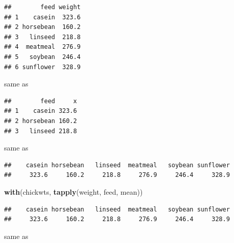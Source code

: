 \documentclass[]{book}
\newenvironment{Shaded}{\begin{snugshade}}{\end{snugshade}}
\newcommand{\DataTypeTok}[1]{\textcolor[rgb]{0.13,0.29,0.53}{#1}}
\newcommand{\DecValTok}[1]{\textcolor[rgb]{0.00,0.00,0.81}{#1}}
\newcommand{\KeywordTok}[1]{\textcolor[rgb]{0.13,0.29,0.53}{\textbf{#1}}}
\newcommand{\NormalTok}[1]{#1}
\newcommand{\OperatorTok}[1]{\textcolor[rgb]{0.81,0.36,0.00}{\textbf{#1}}}
\begin{document}
\begin{verbatim}
##        feed weight
## 1    casein  323.6
## 2 horsebean  160.2
## 3   linseed  218.8
## 4  meatmeal  276.9
## 5   soybean  246.4
## 6 sunflower  328.9
\end{verbatim}

same as

\begin{Shaded}
\end{Shaded}

\begin{verbatim}
##        feed     x
## 1    casein 323.6
## 2 horsebean 160.2
## 3   linseed 218.8
\end{verbatim}

same as

\begin{Shaded}
\end{Shaded}

\begin{verbatim}
##    casein horsebean   linseed  meatmeal   soybean sunflower 
##     323.6     160.2     218.8     276.9     246.4     328.9
\end{verbatim}

\begin{Shaded}
\begin{Highlighting}[]
\KeywordTok{with}\NormalTok{(chickwts, }\KeywordTok{tapply}\NormalTok{(weight, feed, mean))}
\end{Highlighting}
\end{Shaded}

\begin{verbatim}
##    casein horsebean   linseed  meatmeal   soybean sunflower 
##     323.6     160.2     218.8     276.9     246.4     328.9
\end{verbatim}

same as
\end{document}
